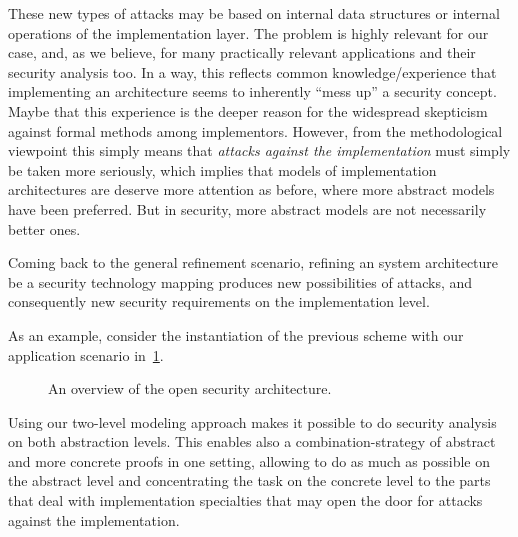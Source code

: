 These new types of attacks may be based on internal data
structures or internal operations of the implementation layer.  The
problem is highly relevant for our case, and, as we believe, for many
practically relevant applications and their security analysis too. In
a way, this reflects common knowledge/experience that implementing an
architecture seems to inherently ``mess up'' a security
concept.  Maybe that this experience is the
deeper reason for the widespread skepticism against formal
methods among implementors. However, from the
methodological viewpoint this simply means that \emph{attacks against
  the implementation} must simply be
taken more seriously, which implies that models of implementation
architectures are deserve more attention as before, where more
abstract models have been preferred.  But in security, more abstract
models are not necessarily better ones.

Coming back to the general refinement scenario, refining an system architecture
be a security technology mapping produces new possibilities of attacks, and
consequently new security requirements on the implementation level.

As an example, consider the instantiation of the previous scheme with our 
application scenario in~\ref{fig:refsec3}.
\begin{figure}
  \center
  \caption{An overview of the open security architecture.\label{fig:refsec3}}
\end{figure}

Using our two-level modeling approach makes it possible to do
security analysis on both abstraction levels.
This enables also a combination-strategy of abstract and more concrete
proofs in one setting, allowing to do as much as possible on the
abstract level and concentrating the task on the concrete level to the
parts that deal with implementation specialties that may open the door
for attacks against the implementation.

